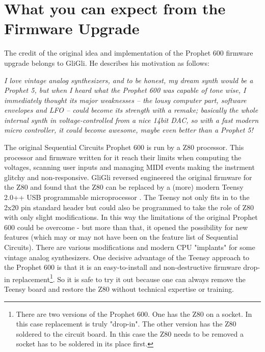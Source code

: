 \documentclass[landscape, 11pt, oneside]{report}
\newenvironment{flowtext}{\addmargin[0cm]{7cm}}{\endaddmargin} %
\begin{document}
\begin{flowtext}

\section{What you can expect from the Firmware Upgrade}

The credit of the original idea and implementation of the Prophet 600 firmware upgrade belongs to GliGli\cite{gligli}. He describes his motivation as follows:

\begin{addmargin}[2cm]{1cm}

\textit{I love vintage analog synthesizers, and to be honest, my dream synth would be a Prophet 5, but when I heard what the Prophet 600 was capable of tone wise, I immediately thought its major weaknesses -- the lousy computer part, software envelopes and LFO -- could become its strength with a remake; basically the whole internal synth in voltage-controlled from a nice 14bit DAC, so with a fast modern micro controller, it could become awesome, maybe even better than a Prophet 5!}

\end{addmargin}

The original Sequential Circuits Prophet 600 is run by a Z80 processor. This processor and firmware written for it reach their limits when computing the voltages, scanning user inputs and managing MIDI events making the instrment glitchy and non-responsive. GliGli reversed engineered the original firmware for the Z80 and found that the Z80 can be replaced by a (more) modern Teensy 2.0++ USB programmable microprocessor \cite{teensy}. The Teensy not only fits in to the 2x20 pin standard header but could also be programmed to take the role of Z80 with only slight modifications. In this way the limitations of the original Prophet 600 could be overcome - but more than that, it opened the possibility for new features (which may or may not have been on the feature list of Sequential Circuits). There are various modifications and modern CPU "implants" for some vintage analog synthesizers. One decisive advantage of the Teensy approach to the Prophet 600 is that it is an easy-to-install and non-destructive firmware drop-in replacement\footnote{There are two versions of the Prophet 600. One has the Z80 on a socket. In this case replacement is truly "drop-in". The other version has the Z80 soldered to the circuit board. In this case the Z80 needs to be removed a socket has to be soldered in its place first.}. So it is safe to try it out because one can always remove the Teensy board and restore the Z80 without technical expertise or training.


\end{flowtext}
\end{document}
